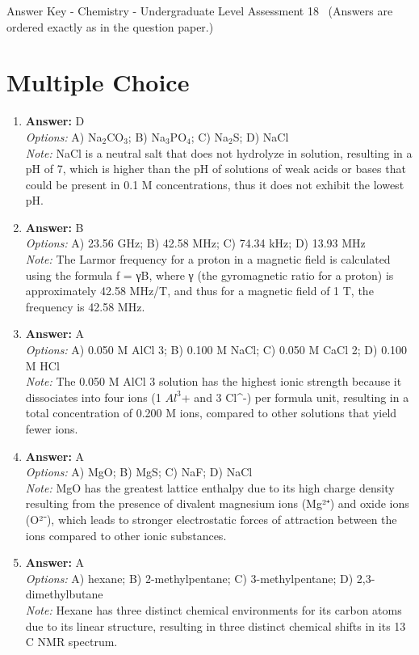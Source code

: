 \documentclass[12pt]{article}
\begin{document}
\begin{center}
Answer Key - Chemistry - Undergraduate Level Assessment 18 \
\small (Answers are ordered exactly as in the question paper.)
\end{center}

\section*{Multiple Choice}
\begin{enumerate}[label=\arabic*.]
\item \textbf{Answer:} D
\\ \textit{Options:} A) Na$_{2}$CO$_{3}$; B) Na$_{3}$PO$_{4}$; C) Na$_{2}$S; D) NaCl
\\ \textit{Note:} NaCl is a neutral salt that does not hydrolyze in solution, resulting in a pH of 7, which is higher than the pH of solutions of weak acids or bases that could be present in 0.1 M concentrations, thus it does not exhibit the lowest pH.
\item \textbf{Answer:} B
\\ \textit{Options:} A) 23.56 GHz; B) 42.58 MHz; C) 74.34 kHz; D) 13.93 MHz
\\ \textit{Note:} The Larmor frequency for a proton in a magnetic field is calculated using the formula f = γB, where γ (the gyromagnetic ratio for a proton) is approximately 42.58 MHz/T, and thus for a magnetic field of 1 T, the frequency is 42.58 MHz.
\item \textbf{Answer:} A
\\ \textit{Options:} A) 0.050 M AlCl 3; B) 0.100 M NaCl; C) 0.050 M CaCl 2; D) 0.100 M HCl
\\ \textit{Note:} The 0.050 M AlCl 3 solution has the highest ionic strength because it dissociates into four ions (1 $Al^3$+ and 3 Cl^-) per formula unit, resulting in a total concentration of 0.200 M ions, compared to other solutions that yield fewer ions.
\item \textbf{Answer:} A
\\ \textit{Options:} A) MgO; B) MgS; C) NaF; D) NaCl
\\ \textit{Note:} MgO has the greatest lattice enthalpy due to its high charge density resulting from the presence of divalent magnesium ions (Mg²⁺) and oxide ions (O²⁻), which leads to stronger electrostatic forces of attraction between the ions compared to other ionic substances.
\item \textbf{Answer:} A
\\ \textit{Options:} A) hexane; B) 2-methylpentane; C) 3-methylpentane; D) 2,3-dimethylbutane
\\ \textit{Note:} Hexane has three distinct chemical environments for its carbon atoms due to its linear structure, resulting in three distinct chemical shifts in its 13 C NMR spectrum.
\end{enumerate}
\end{document}

